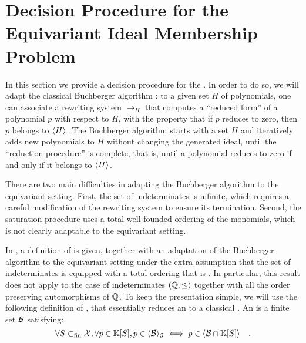 %
\section{Decision Procedure for the Equivariant Ideal Membership Problem}
\label{sec:algorithm}






In this section we provide a decision procedure for the . In order to do so, we will adapt the classical Buchberger
algorithm \cite{BUCH76}: to a given set $H$ of polynomials, one can associate a
rewriting system $\to_H$ that computes a ``reduced form'' of a polynomial $p$
with respect to $H$, with the property that if $p$ reduces to zero, then $p$
belongs to $\langle H\rangle_{}$. The Buchberger algorithm starts with a set $H$ and
iteratively adds new polynomials to $H$ without changing the generated ideal,
until the ``reduction procedure'' is complete, that is, until a polynomial
reduces to zero if and only if it belongs to $\langle H\rangle_{}$.

There are two main difficulties in adapting the Buchberger algorithm to the
equivariant setting. First, the set of indeterminates is infinite, which
requires a careful modification of the rewriting system to ensure its
termination. Second, the saturation procedure uses a total well-founded
ordering of the monomials, which is not clearly adaptable to the equivariant
setting.

In \cite{GHOLAS24}, a definition of  is given,
together with an adaptation of the Buchberger algorithm to the equivariant
setting under the extra assumption that the set of indeterminates is equipped
with a  total ordering that is . In particular, this result does not apply to the case of
indeterminates $(\mathbb{Q}, \leq)$ together with all the order preserving
automorphisms of $\mathbb{Q}$.
To keep the presentation simple, we will use the following definition
of , that essentially
reduces an  to a classical
.
An  
is a finite set $\Basis$
satisfying:
\begin{equation}
    \label{eq:grob-eq-bas}
    \forall S \subfin \X, 
    \forall p \in \poly{\K}{S},
    p \in \gen{\Basis}{\group}
    \iff
    p \in \gen{\Basis \cap \poly{\K}{S}}
        \quad .
\end{equation}


